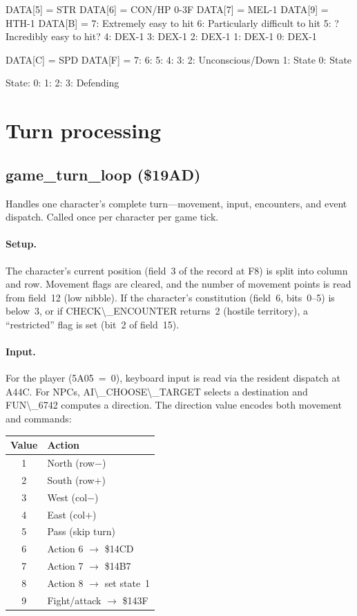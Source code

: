 \documentclass[10pt]{report}
\begin{document}
DATA[5] = STR
DATA[6] = CON/HP 0-3F
DATA[7] = MEL-1
DATA[9] = HTH-1
DATA[B] =
  7: Extremely easy to hit
  6: Particularly difficult to hit
  5: ? Incredibly easy to hit?
  4: DEX-1
  3: DEX-1
  2: DEX-1
  1: DEX-1
  0: DEX-1

DATA[C] = SPD
DATA[F] =
  7:
  6:
  5:
  4:
  3:
  2: Unconscious/Down
  1: State
  0: State

State:
  0:
  1:
  2:
  3: Defending

\section{Turn processing}

\subsection{game\_turn\_loop (\$19AD)}
\label{sec:game-turn-loop}

Handles one character's complete turn---movement, input, encounters,
and event dispatch.  Called once per character per game tick.

\paragraph{Setup.}
The character's current position (field~3 of the record at {\Tt{}{\textbackslash}{\$}F8\nwendquote})
is split into column and row.  Movement flags are cleared, and the
number of movement points is read from field~12 (low nibble).
If the character's constitution (field~6, bits~0--5) is below~3,
or if {\Tt{}CHECK{\textbackslash}{\_}ENCOUNTER\nwendquote} returns~2 (hostile territory), a
``restricted'' flag is set (bit~2 of field~15).

\paragraph{Input.}
For the player ({\Tt{}{\textbackslash}{\$}5A05\nwendquote}~=~0), keyboard input is read via the
resident dispatch at {\Tt{}{\textbackslash}{\$}A44C\nwendquote}.  For NPCs, {\Tt{}AI{\textbackslash}{\_}CHOOSE{\textbackslash}{\_}TARGET\nwendquote}
selects a destination and {\Tt{}FUN{\textbackslash}{\_}6742\nwendquote} computes a direction.
The direction value encodes both movement and commands:

\begin{center}
\begin{tabular}{cl}
\textbf{Value} & \textbf{Action} \\
\hline
1 & North (row$-$) \\
2 & South (row$+$) \\
3 & West (col$-$) \\
4 & East (col$+$) \\
5 & Pass (skip turn) \\
6 & Action 6 $\to$ \$14CD \\
7 & Action 7 $\to$ \$14B7 \\
8 & Action 8 $\to$ set state~1 \\
9 & Fight/attack $\to$ \$143F
\end{tabular}
\end{center}
\end{document}
